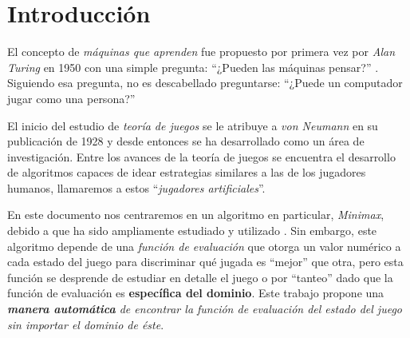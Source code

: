 \section{Introducción}
  El concepto de \textit{máquinas que aprenden} fue propuesto por primera vez por \textit{Alan 
  Turing} en 1950 con una simple pregunta: \enquote{¿Pueden las máquinas pensar?} 
  \autocite{turingCOMPUTINGMACHINERYINTELLIGENCE1950}.
  Siguiendo esa pregunta, no es descabellado preguntarse: \enquote{¿Puede un computador jugar como 
  una persona?}

  El inicio del estudio de \textit{teoría de juegos} se le atribuye a \textit{von Neumann} en su 
  publicación de 1928 \autocite{v.neumannZurTheorieGesellschaftsspiele1928} y desde entonces se ha 
  desarrollado como un área de investigación.
  Entre los avances de la teoría de juegos se encuentra el desarrollo de algoritmos capaces de 
  idear estrategias similares a las de los jugadores humanos, llamaremos a estos 
  \enquote{\textit{jugadores artificiales}}.

  En este documento nos centraremos en un algoritmo en particular, \textit{Minimax}, debido a que ha
  sido ampliamente estudiado y utilizado \autocite{v.neumannZurTheorieGesellschaftsspiele1928,
  fanMinimaxTheorems1953,maschlerGameTheory2013,thekumparampilEfficientAlgorithmsSmooth2019,
  Minimax2022}.
  Sin embargo, este algoritmo depende de una \textit{función de evaluación} que otorga un valor
  numérico a cada estado del juego para discriminar qué jugada es \enquote{mejor} que otra, pero 
  esta función se desprende de estudiar en detalle el juego 
  \autocite{shannonProgrammingComputerPlaying1988} o por \enquote{tanteo} dado que la función de 
  evaluación es \textbf{específica del dominio}\autocite{dyerCS540Lecture}.
  Este trabajo propone una \textit{\textbf{manera automática} de encontrar la función de evaluación 
  del estado del juego sin importar el dominio de éste}.